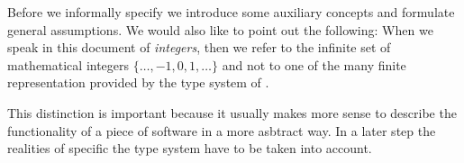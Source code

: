 Before we informally specify \bitwalker
we introduce some auxiliary concepts and formulate general assumptions.
We would also like to point out the following:
When we speak in this document of \emph{integers},
then we refer to the infinite set of mathematical
integers $\{\ldots, -1, 0, 1, \ldots\}$
and not to one of the many finite representation provided by the type system of \isoc.

This distinction is important because it usually makes more sense
to describe the functionality of a piece of software in a more
asbtract way.
In a later step the realities of specific the \isoc type system
have to be taken into account.

